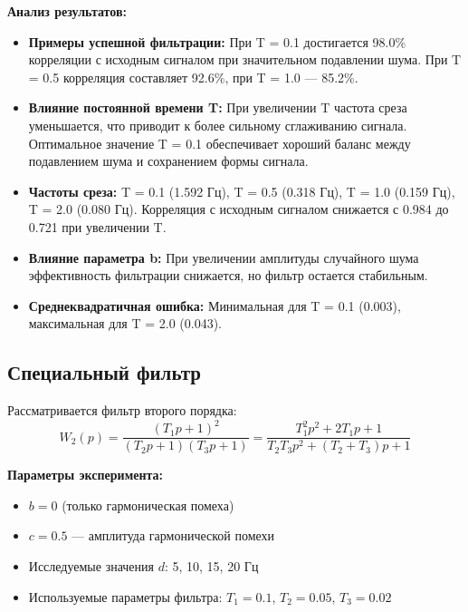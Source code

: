 \textbf{Анализ результатов:}
\begin{itemize}
    \item \textbf{Примеры успешной фильтрации:} При T = 0.1 достигается 98.0\% корреляции с исходным сигналом при значительном подавлении шума. При T = 0.5 корреляция составляет 92.6\%, при T = 1.0 — 85.2\%.
    
    \item \textbf{Влияние постоянной времени T:} При увеличении T частота среза уменьшается, что приводит к более сильному сглаживанию сигнала. Оптимальное значение T = 0.1 обеспечивает хороший баланс между подавлением шума и сохранением формы сигнала.
    
    \item \textbf{Частоты среза:} T = 0.1 (1.592 Гц), T = 0.5 (0.318 Гц), T = 1.0 (0.159 Гц), T = 2.0 (0.080 Гц). Корреляция с исходным сигналом снижается с 0.984 до 0.721 при увеличении T.
    
    \item \textbf{Влияние параметра b:} При увеличении амплитуды случайного шума эффективность фильтрации снижается, но фильтр остается стабильным.
    
    \item \textbf{Среднеквадратичная ошибка:} Минимальная для T = 0.1 (0.003), максимальная для T = 2.0 (0.043).
\end{itemize}

\subsection*{Специальный фильтр}

Рассматривается фильтр второго порядка:
\begin{equation}
W_2(p) = \frac{(T_1 p + 1)^2}{(T_2 p + 1)(T_3 p + 1)} = \frac{T_1^2 p^2 + 2T_1 p + 1}{T_2 T_3 p^2 + (T_2 + T_3) p + 1}
\end{equation}

\textbf{Параметры эксперимента:}
\begin{itemize}
    \item $b = 0$ (только гармоническая помеха)
    \item $c = 0.5$ — амплитуда гармонической помехи
    \item Исследуемые значения $d$: 5, 10, 15, 20 Гц
    \item Используемые параметры фильтра: $T_1 = 0.1$, $T_2 = 0.05$, $T_3 = 0.02$
\end{itemize}


